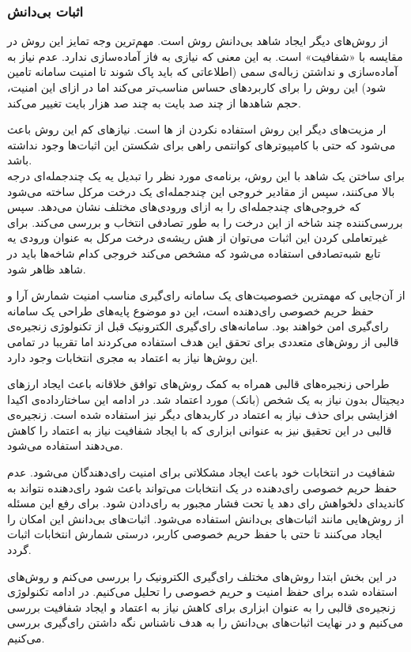 \subsubsection{اثبات بی‌دانش }
از روش‌های دیگر ایجاد شاهد بی‌دانش روش 
\cite{zkstark}
است. مهم‌ترین وجه تمایز این روش در مقایسه با
 «شفافیت»
است. به این معنی که نیازی به فاز آماده‌سازی ندارد. عدم نیاز به آماده‌سازی و نداشتن زباله‌ی سمی (اطلاعاتی که باید پاک شوند تا امنیت سامانه تامین شود) این روش را برای کاربرد‌های حساس مناسب‌تر می‌کند اما در ازای این امنیت، حجم شاهد‌ها از چند صد بایت به چند صد هزار بایت تغییر می‌کند.
\par
ار مزیت‌های دیگر این روش استفاده نکردن از 
ها
است. نیاز‌های کم این روش باعث می‌شود که حتی با کامپیوتر‌های کوانتمی
 راهی برای شکستن این اثبات‌ها وجود نداشته باشد.
\\
برای ساختن یک شاهد با این روش، برنامه‌ی مورد نظر را تبدیل یه یک چندجمله‌ای درجه بالا می‌کنند، سپس از مقادیر خروجی این چندجمله‌ای یک درخت مرکل ساخته می‌شود که خروجی‌های چند‌جمله‌ای را به ازای ورودی‌های مختلف نشان می‌دهد. سپس بررسی‌کننده چند شاخه از این درخت را به طور تصادفی انتخاب و بررسی می‌کند. برای غیرتعاملی کردن این اثبات می‌توان از هش ریشه‌ی درخت مرکل به عنوان ورودی یه تابع شبه‌تصادفی
استفاده می‌شود که مشخص می‌کند خروجی کدام شاخه‌ها باید در شاهد ظاهر شود. 






از آن‌جایی که مهمترین خصوصیت‌های یک سامانه رای‌گیری مناسب امنیت شمارش آرا و حفظ حریم خصوصی رای‌دهنده است، این دو موضوع پایه‌های طراحی یک سامانه رای‌گیری امن خواهند بود. سامانه‌های رای‌گیری الکترونیک قبل از تکنولوژی زنجیره‌ی قالبی از روش‌های متعددی برای تحقق این هدف استفاده می‌کردند اما تقریبا در تمامی این روش‌ها نیاز به اعتماد به مجری انتخابات وجود دارد. 
\par
طراحی زنجیره‌های قالبی همراه به کمک روش‌های توافق خلاقانه باعث ایجاد ارز‌های دیجیتال بدون نیاز به یک شخص (بانک) مورد اعتماد شد. در ادامه این ساختارداده‌ی اکیدا افزایشی برای حذف نیاز به اعتماد در کاربدهای دیگر نیز استفاده شده است. زنجیره‌ی قالبی در این تحقیق نیز به عنوانی ابزاری که با ایجاد شفافیت نیاز به اعتماد را کاهش می‌دهند استفاده می‌شود.
\par 
شفافیت در انتخابات خود باعث ایجاد مشکلاتی برای امنیت رای‌دهندگان می‌شود. عدم حفظ حریم خصوصی رای‌دهنده در یک انتخابات می‌تواند باعث شود رای‌دهنده نتواند به کاندیدای دلخواهش رای دهد یا تحت فشار مجبور به رای‌دادن شود. برای رفع این مسئله از روش‌هایی مانند اثبات‌های بی‌دانش استفاده می‌شود. اثبات‌های بی‌دانش این امکان را ایجاد می‌کنند تا حتی با حفظ حریم خصوصی کاربر، درستی شمارش انتخابات اثبات گردد.
\par
در این بخش ابتدا روش‌های مختلف رای‌گیری الکترونیک را بررسی می‌کنم و روش‌های استفاده شده برای حفظ امنیت و حریم خصوصی را تحلیل می‌کنیم. در ادامه تکنولوژی زنجیره‌ی قالبی را به عنوان ابزاری برای کاهش نیاز به اعتماد و ایجاد شفافیت بررسی می‌کنیم و در نهایت اثبات‌های بی‌دانش را به هدف ناشناس نگه‌ داشتن رای‌گیری بررسی می‌کنیم.

